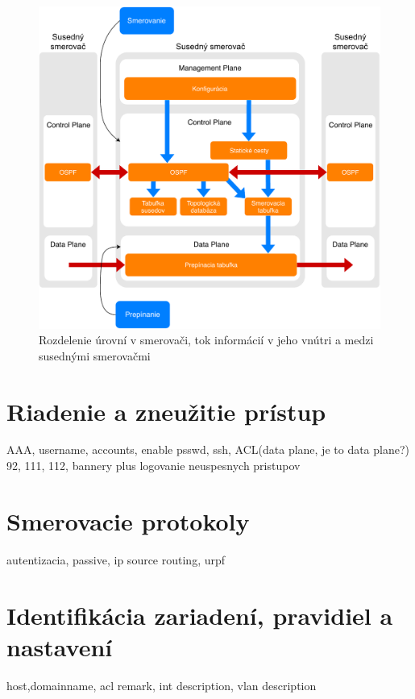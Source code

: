 \begin{figure}[H]
	\begin{center}
		\includegraphics[scale=0.6]{obrazky/SDN_planes.pdf}
	\end{center}
	\caption[Rozdelenie úrovní v smerovači, tok informácií v jeho vnútri a medzi susednými smerovačmi]{Rozdelenie úrovní v smerovači, tok informácií v jeho vnútri a medzi susednými smerovačmi \cite{Pepelnjak2013}}
	\label{sdn-planes}
\end{figure} 




\section{Riadenie a zneužitie prístup}
AAA, username, accounts, enable psswd, ssh, ACL(data plane, je to data plane?) 92, 111, 112, bannery plus logovanie neuspesnych pristupov

\section{Smerovacie protokoly}
autentizacia, passive, ip source routing, urpf


\section{Identifikácia zariadení, pravidiel a nastavení}
host,domainname, acl remark, int description, vlan description

